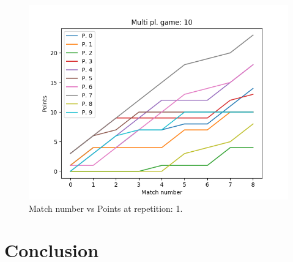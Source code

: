\documentclass[journal,a4paper,10pt,twoside,draft]{IEEEtran}
\begin{document}
\begin{figure}
    \centering
    \includegraphics[width=1\columnwidth]{../img_v1/cidpmp-scores-10.png}
    \caption{Match number vs Points at repetition: 1.}
    \label{fig:cmpipd1}
\end{figure}



\section{Conclusion} \label{Conclusion}

%
%
\end{document}
